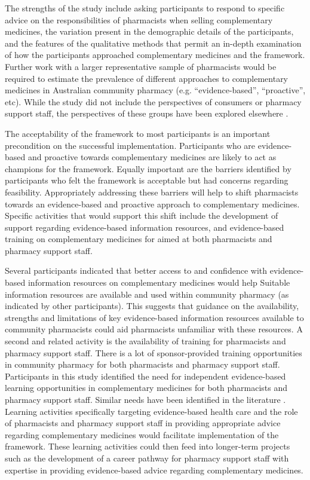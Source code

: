\documentclass[12pt,]{article}
\begin{document}
The strengths of the study include asking participants to respond to
specific advice on the responsibilities of pharmacists when selling
complementary medicines, the variation present in the demographic
details of the participants, and the features of the qualitative methods
that permit an in-depth examination of how the participants approached
complementary medicines and the framework. Further work with a larger
representative sample of pharmacists would be required to estimate the
prevalence of different approaches to complementary medicines in
Australian community pharmacy (e.g. ``evidence-based'', ``proactive'',
etc). While the study did not include the perspectives of consumers or
pharmacy support staff, the perspectives of these groups have been
explored elsewhere \autocite{Iyer2016a}.

The acceptability of the framework to most participants is an important
precondition on the successful implementation. Participants who are
evidence-based and proactive towards complementary medicines are likely
to act as champions for the framework. Equally important are the
barriers identified by participants who felt the framework is acceptable
but had concerns regarding feasibility. Appropriately addressing these
barriers will help to shift pharmacists towards an evidence-based and
proactive approach to complementary medicines. Specific activities that
would support this shift include the development of support regarding
evidence-based information resources, and evidence-based training on
complementary medicines for aimed at both pharmacists and pharmacy
support staff.

Several participants indicated that better access to and confidence with
evidence-based information resources on complementary medicines would
help Suitable information resources are available and used within
community pharmacy (as indicated by other participants). This suggests
that guidance on the availability, strengths and limitations of key
evidence-based information resources available to community pharmacists
could aid pharmacists unfamiliar with these resources. A second and
related activity is the availability of training for pharmacists and
pharmacy support staff. There is a lot of sponsor-provided training
opportunities in community pharmacy for both pharmacists and pharmacy
support staff. Participants in this study identified the need for
independent evidence-based learning opportunities in complementary
medicines for both pharmacists and pharmacy support staff. Similar needs
have been identified in the literature
\autocites{Tiralongo2010}{Iyer2016a}. Learning activities specifically
targeting evidence-based health care and the role of pharmacists and
pharmacy support staff in providing appropriate advice regarding
complementary medicines would facilitate implementation of the
framework. These learning activities could then feed into longer-term
projects such as the development of a career pathway for pharmacy
support staff with expertise in providing evidence-based advice
regarding complementary medicines.
\end{document}
